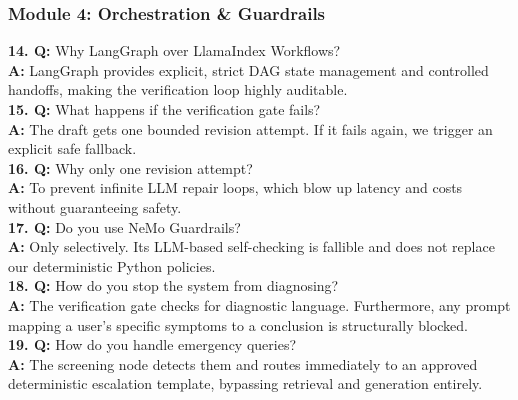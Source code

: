 \documentclass[11pt,a4paper]{article}
\begin{document}
\subsubsection{Module 4: Orchestration \& Guardrails}
\textbf{14. Q:} Why LangGraph over LlamaIndex Workflows? \\
\textbf{A:} LangGraph provides explicit, strict DAG state management and controlled handoffs, making the verification loop highly auditable. \\
\textbf{15. Q:} What happens if the verification gate fails? \\
\textbf{A:} The draft gets one bounded revision attempt. If it fails again, we trigger an explicit safe fallback. \\
\textbf{16. Q:} Why only one revision attempt? \\
\textbf{A:} To prevent infinite LLM repair loops, which blow up latency and costs without guaranteeing safety. \\
\textbf{17. Q:} Do you use NeMo Guardrails? \\
\textbf{A:} Only selectively. Its LLM-based self-checking is fallible and does not replace our deterministic Python policies. \\
\textbf{18. Q:} How do you stop the system from diagnosing? \\
\textbf{A:} The verification gate checks for diagnostic language. Furthermore, any prompt mapping a user's specific symptoms to a conclusion is structurally blocked. \\
\textbf{19. Q:} How do you handle emergency queries? \\
\textbf{A:} The screening node detects them and routes immediately to an approved deterministic escalation template, bypassing retrieval and generation entirely.
\end{document}
